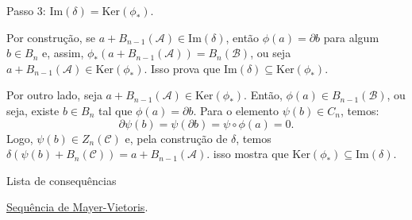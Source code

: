 \begin{dem}
    Passo 3: $\text{Im}(\delta)=\text{Ker}(\phi_*)$.

    Por construção, se $a+B_{n-1}(\mathcal{A})\in \text{Im}(\delta)$, então $\phi(a)=\partial b$ para algum $b\in B_n$ e, assim, $\phi_*(a+B_{n-1}(\mathcal{A}))=B_n(\mathcal{B})$, ou seja $a+B_{n-1}(\mathcal{A})\in \text{Ker}(\phi_*)$. Isso prova que $\text{Im}(\delta)\subseteq \text{Ker}(\phi_*)$. 

    Por outro lado, seja $a+B_{n-1}(\mathcal{A})\in \text{Ker}(\phi_*)$. Então, $\phi(a)\in B_{n-1}(\mathcal{B})$, ou seja, existe $b\in B_n$ tal que $\phi(a)=\partial b$. Para o elemento $\psi(b)\in C_n$, temos:
    \[\partial \psi(b)=\psi(\partial b)=\psi\circ\phi(a)=0.\]
    Logo, $\psi(b)\in Z_n(\mathcal{C})$ e, pela construção de $\delta$, temos $\delta
    (\psi(b)+B_n(\mathcal{C}))=a+B_{n-1}(\mathcal{A}).$ isso mostra que $\text{Ker}(\phi_*)\subseteq \text{Im}(\delta)$.
\end{dem}
    
\begin{titlemize}{Lista de consequências}
    \item \hyperref[sequencia-de-mayer-vietoris-prop]{Sequência de Mayer-Vietoris}.
\end{titlemize}

